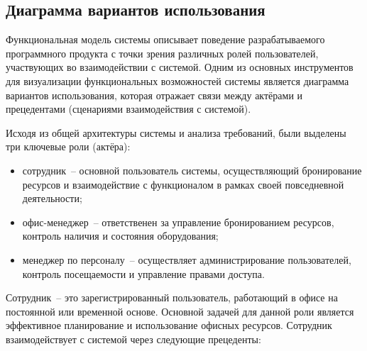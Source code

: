 \subsection{Диаграмма вариантов использования}
\label{sec:tech-requirements:functional-model}

Функциональная модель системы описывает поведение разрабатываемого программного продукта с точки зрения различных ролей пользователей, участвующих во взаимодействии с системой. Одним из основных инструментов для визуализации функциональных возможностей системы является диаграмма вариантов использования, которая отражает связи между актёрами и прецедентами (сценариями взаимодействия с системой).

Исходя из общей архитектуры системы и анализа требований, были выделены три ключевые роли (актёра):

\begin{itemize}
    \item сотрудник~-- основной пользователь системы, осуществляющий бронирование ресурсов и взаимодействие с функционалом в рамках своей повседневной деятельности;
    \item офис-менеджер~-- ответственен за управление бронированием ресурсов, контроль наличия и состояния оборудования;
    \item менеджер по персоналу~-- осуществляет администрирование пользователей, контроль посещаемости и управление правами доступа.
\end{itemize}

Сотрудник~-- это зарегистрированный пользователь, работающий в офисе на постоянной или временной основе. Основной задачей для данной роли является эффективное планирование и использование офисных ресурсов. Сотрудник взаимодействует с системой через следующие прецеденты:

